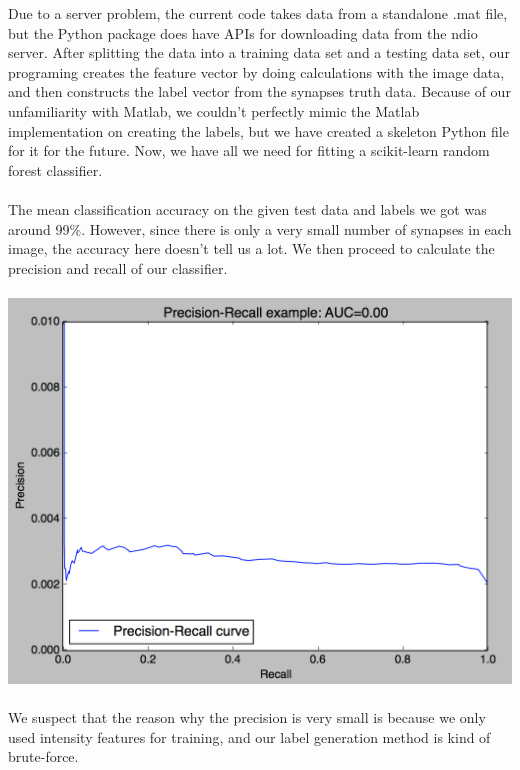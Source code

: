 \documentclass[11pt]{article} %
\begin{document}
Due to a server problem, the current code takes data from a standalone .mat file, but the Python package does have APIs for downloading data from the ndio server. After splitting the data into a training data set and a testing data set, our programing creates the feature vector by doing calculations with the image data, and then constructs the label vector from the synapses truth data. Because of our unfamiliarity with Matlab, we couldn't perfectly mimic the Matlab implementation on creating the labels, but we have created a skeleton Python file for it for the future. Now, we have all we need for fitting a scikit-learn random forest classifier.\\\\
The mean classification accuracy on the given test data and labels we got was around 99\%. However, since there is only a very small number of synapses in each image, the accuracy here doesn't tell us a lot. We then proceed to calculate the precision and recall of our classifier.\\\\
\includegraphics[width=\textwidth]{figures/precision-recall-plot.png}\\\\
We suspect that the reason why the precision is very small is because we only used intensity features for training, and our label generation method is kind of brute-force.
\end{document}

